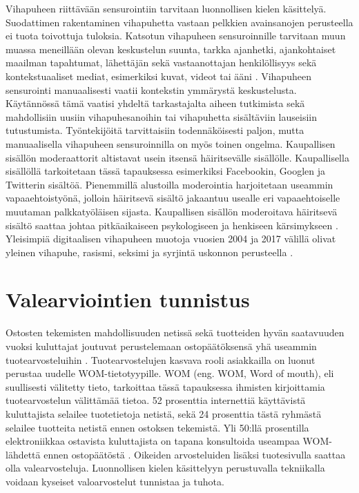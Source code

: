 Vihapuheen riittävään sensurointiin tarvitaan luonnollisen kielen käsittelyä. Suodattimen rakentaminen vihapuhetta vastaan pelkkien avainsanojen perusteella ei tuota toivottuja tuloksia. Katsotun vihapuheen sensuroinnille tarvitaan muun muassa meneillään olevan keskustelun suunta, tarkka ajanhetki, ajankohtaiset maailman tapahtumat, lähettäjän sekä vastaanottajan henkilöllisyys sekä kontekstuaaliset mediat, esimerkiksi kuvat, videot tai ääni \citep{hate}. Vihapuheen sensurointi manuaalisesti vaatii kontekstin ymmärystä keskustelusta. Käytännössä tämä vaatisi yhdeltä tarkastajalta aiheen tutkimista sekä mahdollisiin uusiin vihapuhesanoihin tai vihapuhetta sisältäviin lauseisiin tutustumista. Työntekijöitä tarvittaisiin todennäköisesti paljon, mutta manuaalisella vihapuheen sensuroinnilla on myös toinen ongelma. Kaupallisen sisällön moderaattorit altistavat usein itsensä häiritsevälle sisällölle. Kaupallisella sisällöllä tarkoitetaan tässä tapauksessa esimerkiksi Facebookin, Googlen ja Twitterin sisältöä. Pienemmillä alustoilla moderointia harjoitetaan useammin vapaaehtoistyönä, jolloin häiritsevä sisältö jakaantuu usealle eri vapaaehtoiselle muutaman palkkatyöläisen sijasta. Kaupallisen sisällön moderoitava häiritsevä sisältö saattaa johtaa pitkäaikaiseen psykologiseen ja henkiseen kärsimykseen \citep{moderation}. Yleisimpiä digitaalisen vihapuheen muotoja vuosien 2004 ja 2017 välillä olivat yleinen vihapuhe, rasismi, seksimi ja syrjintä uskonnon perusteella \citep{hatespeech-stats}.

\section{Valearviointien tunnistus}
Ostosten tekemisten mahdollisuuden netissä sekä tuotteiden hyvän saatavuuden vuoksi kuluttajat joutuvat perustelemaan ostopäätöksensä yhä useammin tuotearvosteluihin \citep{falsereview}. Tuotearvostelujen kasvava rooli asiakkailla on luonut perustaa uudelle WOM-tietotyypille. WOM (eng. WOM, Word of mouth), eli suullisesti välitetty tieto, tarkoittaa tässä tapauksessa ihmisten kirjoittamia tuotearvostelun välittämää tietoa. 52 prosenttia internettiä käyttävistä kuluttajista selailee tuotetietoja netistä, sekä 24 prosenttia tästä ryhmästä selailee tuotteita netistä ennen ostoksen tekemistä. Yli 50:llä prosentilla elektroniikkaa ostavista kuluttajista on tapana konsultoida useampaa WOM-lähdettä ennen ostopäätöstä \citep{fakereview-stats}. Oikeiden arvosteluiden lisäksi tuotesivulla saattaa olla valearvosteluja. Luonnollisen kielen käsittelyyn perustuvalla tekniikalla voidaan kyseiset valoarvostelut tunnistaa ja tuhota.

